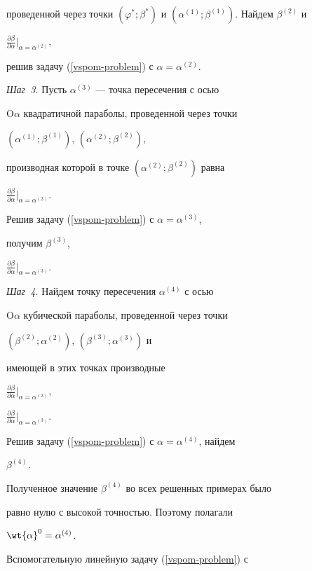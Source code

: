 проведенной через точки $(\varphi^*; \beta^*)$ и $(\alpha^{(1)};


\beta^{(1)})$. Найдем $\beta^{(2)}$ и


$\frac{\partial\beta}{\partial\alpha}|_{\alpha=\alpha^{(2)}}$,


решив задачу (\ref{vspom-problem}) с $\alpha=\alpha^{(2)}$.





{\it Шаг~3.} Пусть $\alpha^{(3)}$ --- точка пересечения с осью


O$\alpha$ квадратичной параболы, проведенной через точки


$(\alpha^{(1)}; \beta^{(1)})$, $(\alpha^{(2)}; \beta^{(2)})$,


производная которой в точке $(\alpha^{(2)}; \beta^{(2)})$ равна


$\frac{\partial\beta}{\partial\alpha}|_{\alpha=\alpha^{(2)}}$.


Решив задачу (\ref{vspom-problem}) с $\alpha=\alpha^{(3)}$,


получим $\beta^{(3)}$,


$\frac{\partial\beta}{\partial\alpha}|_{\alpha=\alpha^{(3)}}$.





{\it Шаг~4.} Найдем точку пересечения $\alpha^{(4)}$ с осью


O$\alpha$ кубической параболы, проведенной через точки


$(\beta^{(2)}; \alpha^{(2)})$, $(\beta^{(3)}; \alpha^{(3)})$ и


имеющей в этих точках производные


$\frac{\partial\beta}{\partial\alpha}|_{\alpha=\alpha^{(2)}}$,


$\frac{\partial\beta}{\partial\alpha}|_{\alpha=\alpha^{(3)}}$.


Решив задачу (\ref{vspom-problem}) с $\alpha=\alpha^{(4)}$, найдем


$\beta^{(4)}$.





Полученное значение $\beta^{(4)}$ во всех решенных примерах было


равно нулю с высокой точностью. Поэтому полагали


$\wt{\alpha}^0=\alpha^{(4)}$.





Вспомогательную линейную задачу (\ref{vspom-problem}) с


